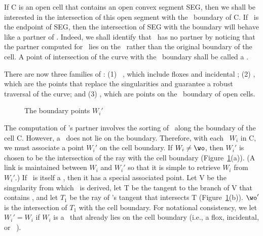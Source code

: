 
If C is an open cell that contains an open convex segment SEG,
then we shall be interested in the intersection of this open segment with the
\artificial\ boundary of C.
If \wo\ is the endpoint of SEG, then the intersection of SEG with the boundary
will behave like a partner of \wo.
Indeed, we shall identify that \wo\ has no partner by noticing that the
partner computed for \wo\ lies on the \artificial\ rather than the
original boundary of the cell.
A point of intersection of the curve with the \artificial\ boundary shall
be called a {\bf \artificialcurvepoint}.

There are now three families of \wallpoints:
(1) \original\ \wallpoints, which include floxes and incidental 
\wallpoints;
(2) \pseudos, which are the points that replace the singularities 
and guarantee a robust traversal of the curve; and
(3) \artificialcurvepoints, which are points on the \artificial\ boundary
of open cells.
%
\begin{figure}[htbp]\vspace{3.75in}\caption{The boundary points $W_{i}'$}\label{3.J}\end{figure}

%
The computation of \wo's partner involves the sorting of \wallpoints\ along
the boundary of the cell C.
However, a \pseudo\ does not lie on the boundary.
Therefore, with each \pseudo\ $W_{i}$ in C, we must associate a point $W_{i}'$
on the cell boundary.
If $W_{i} \neq \wo$,  then $W_{i}'$ is chosen to be the intersection of
the ray  with the cell boundary (Figure~\ref{3.J}(a)).
(A link is maintained between $W_{i}$ and $W_{i}'$ so that it is simple
to retrieve $W_{i}$ from $W_{i}'$.)
If \wo\ is itself a \pseudo, then it has a special associated point.
Let V be the singularity from which \wo\ is derived, let T be the tangent
to the branch of V that contains \wo, and
let $T_{1}$ be the ray of \wo's tangent that intersects 
T (Figure~\ref{3.J}(b)).
$\wo '$ is the intersection of $T_{1}$ with the cell boundary.
For notational consistency, we let $W_{i}' = W_{i}$
if $W_{i}$ is a \wallpoint\ that already lies on the cell boundary
(i.e., a flox, incidental, or \artificial\ \wallpoint).

